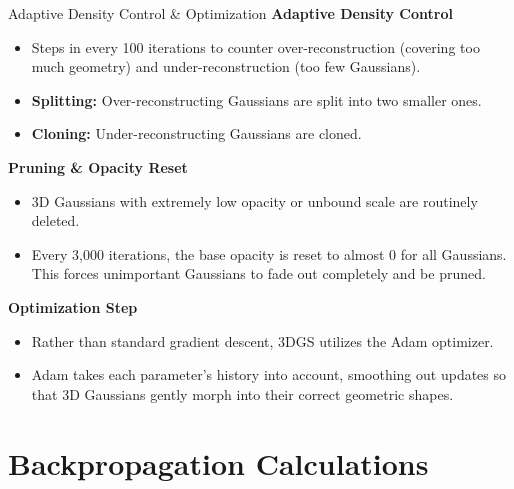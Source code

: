 \begin{frame}{Adaptive Density Control \& Optimization}
    \textbf{Adaptive Density Control}
    \begin{itemize}
        \justifying
        \item Steps in every 100 iterations to counter over-reconstruction (covering too much geometry) and under-reconstruction (too few Gaussians).
        \item \textbf{Splitting:} Over-reconstructing Gaussians are split into two smaller ones.
        \item \textbf{Cloning:} Under-reconstructing Gaussians are cloned.
    \end{itemize}

    \vspace{0.5em}

    \textbf{Pruning \& Opacity Reset}
    \begin{itemize}
        \justifying
        \item 3D Gaussians with extremely low opacity or unbound scale are routinely deleted.
        \item Every 3,000 iterations, the base opacity is reset to almost 0 for all Gaussians. This forces unimportant Gaussians to fade out completely and be pruned.
    \end{itemize}

    \vspace{0.5em}

    \textbf{Optimization Step}
    \begin{itemize}
        \justifying
        \item Rather than standard gradient descent, 3DGS utilizes the Adam optimizer.
        \item Adam takes each parameter's history into account, smoothing out updates so that 3D Gaussians gently morph into their correct geometric shapes.
    \end{itemize}

\end{frame}

\section{Backpropagation Calculations}


